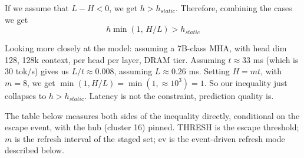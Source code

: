 \documentclass[11pt,a4paper]{article}
\begin{document}
If we assume that $L-H < 0$, we get $h > h_{static}$. Therefore, combining the cases we get
\begin{equation*}
    h \min(1,\, H/L) > h_{static}
\end{equation*}

Looking more closely at the model: assuming a 7B-class MHA, with head dim 128, 128k context, per head per layer, DRAM tier. Assuming $t \approx 33$ ms (which is 30 tok/s) gives us $L/t \approx 0.008$, assuming $L \approx 0.26$ ms. Setting $H = mt$, with $m = 8$, we get $\min(1, H/L) = \min(1, \approx\!10^3) = 1$. So our inequality just collapses to $h > h_{static}$. Latency is not the constraint, prediction quality is.

The table below measures both sides of the inequality directly, conditional on the escape event, with the hub (cluster 16) pinned. THRESH is the escape threshold; $m$ is the refresh interval of the staged set; ev is the event-driven refresh mode described below.
\end{document}
